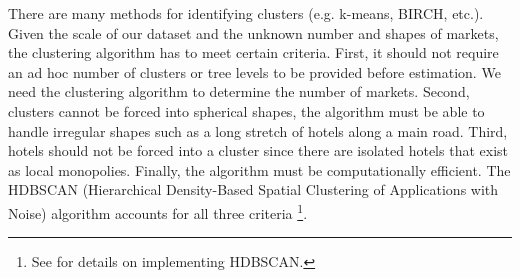 \documentclass[mksc,blindrev]{informs3} %
\begin{document}
There are many methods for identifying clusters (e.g. k-means, BIRCH, etc.). Given the scale of our dataset and the unknown number and shapes of markets, the clustering algorithm has to meet certain criteria. First, it should not require an ad hoc number of clusters or tree levels to be provided before estimation. We need the clustering algorithm to determine the number of markets. Second, clusters cannot be forced into spherical shapes, the algorithm must be able to handle irregular shapes such as a long stretch of hotels along a main road.  Third, hotels should not be forced into a cluster since there are isolated hotels that exist as local monopolies. Finally, the algorithm must be computationally efficient.  The HDBSCAN (Hierarchical Density-Based Spatial Clustering of Applications with Noise) algorithm accounts for all three criteria \citep{campello2013density,mcinnes2017hdbscan}\footnote{See \citet{mcinnes2017hdbscan} for details on implementing HDBSCAN.}. 


\end{document}
